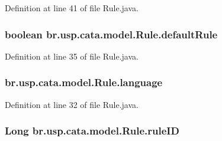 Definition at line 41 of file Rule.\+java.

\hypertarget{classbr_1_1usp_1_1cata_1_1model_1_1_rule_a4b72bd669675605d206a93e1fa44fcad}{
\subsubsection[{default\+Rule}]{\setlength{\rightskip}{0pt plus 5cm}boolean br.\+usp.\+cata.\+model.\+Rule.\+default\+Rule\hspace{0.3cm}{\ttfamily [private]}}}\label{classbr_1_1usp_1_1cata_1_1model_1_1_rule_a4b72bd669675605d206a93e1fa44fcad}


Definition at line 35 of file Rule.\+java.

\hypertarget{classbr_1_1usp_1_1cata_1_1model_1_1_rule_a6a70b9b6688aac9ad8807b408725ee16}{
\subsubsection[{language}]{ br.\+usp.\+cata.\+model.\+Rule.\+language\hspace{0.3cm}{\ttfamily [private]}}}\label{classbr_1_1usp_1_1cata_1_1model_1_1_rule_a6a70b9b6688aac9ad8807b408725ee16}


Definition at line 32 of file Rule.\+java.

\hypertarget{classbr_1_1usp_1_1cata_1_1model_1_1_rule_ad227e5272ff0fab9cd3f12faf5cfbb8e}{
\subsubsection[{rule\+I\+D}]{\setlength{\rightskip}{0pt plus 5cm}Long br.\+usp.\+cata.\+model.\+Rule.\+rule\+I\+D\hspace{0.3cm}{\ttfamily [private]}}}\label{classbr_1_1usp_1_1cata_1_1model_1_1_rule_ad227e5272ff0fab9cd3f12faf5cfbb8e}


